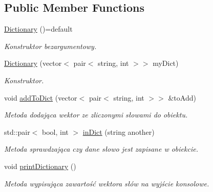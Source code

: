 \subsection*{Public Member Functions}
\begin{DoxyCompactItemize}
\item 
\mbox{\label{class_dictionary_ac81c71164aa52b6d0283d5668022d1fc}} 
\mbox{\hyperlink{class_dictionary_ac81c71164aa52b6d0283d5668022d1fc}{Dictionary}} ()=default
\begin{DoxyCompactList}\small\item\em Konstruktor bezargumentowy. \end{DoxyCompactList}\item 
\mbox{\hyperlink{class_dictionary_aa162f77ffd281cebb669e6cdd3961524}{Dictionary}} (vector$<$ pair$<$ string, int $>$$>$ my\+Dict)
\begin{DoxyCompactList}\small\item\em Konstruktor. \end{DoxyCompactList}\item 
void \mbox{\hyperlink{class_dictionary_acfff484035a16775df9621b012d3f8cd}{add\+To\+Dict}} (vector$<$ pair$<$ string, int $>$$>$ \&to\+Add)
\begin{DoxyCompactList}\small\item\em Metoda dodająca wektor ze zliczonymi słowami do obiektu. \end{DoxyCompactList}\item 
std\+::pair$<$ bool, int $>$ \mbox{\hyperlink{class_dictionary_ae20890658661737cc9c5e359384489a6}{in\+Dict}} (string another)
\begin{DoxyCompactList}\small\item\em Metoda sprawdzająca czy dane słowo jest zapisane w obiekcie. \end{DoxyCompactList}\item 
\mbox{\label{class_dictionary_a3260ddd92c3ffe8b2e07202076354d2b}} 
void \mbox{\hyperlink{class_dictionary_a3260ddd92c3ffe8b2e07202076354d2b}{print\+Dictionary}} ()
\begin{DoxyCompactList}\small\item\em Metoda wypisująca zawartość wektora słów na wyjście konsolowe. \end{DoxyCompactList}\end{DoxyCompactItemize}

